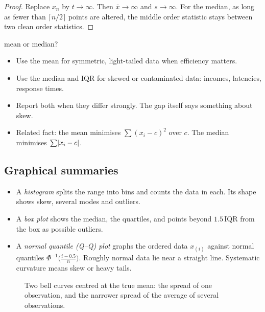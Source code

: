\begin{proof}
Replace $x_n$ by $t\to\infty$. Then $\bar{x}\to\infty$ and $s\to\infty$. For the median, as long as fewer than $\lceil n/2\rceil$ points are altered, the middle order statistic stays between two clean order statistics.
\end{proof}

\begin{interview}{mean or median?}
\begin{itemize}
  \item Use the mean for symmetric, light-tailed data when efficiency matters.
  \item Use the median and IQR for skewed or contaminated data: incomes, latencies, response times.
  \item Report both when they differ strongly. The gap itself says something about skew.
  \item Related fact: the mean minimises $\sum(x_i-c)^2$ over $c$. The median minimises $\sum\lvert x_i-c\rvert$.
\end{itemize}
\end{interview}

\subsection*{Graphical summaries}

\begin{itemize}
  \item A \emph{histogram} splits the range into bins and counts the data in each. Its shape shows skew, several modes and outliers.
  \item A \emph{box plot} shows the median, the quartiles, and points beyond $1.5\,\mathrm{IQR}$ from the box as possible outliers.
  \item A \emph{normal quantile (Q--Q) plot} graphs the ordered data $x_{(i)}$ against normal quantiles $\Phi^{-1}\big(\tfrac{i-0.5}{n}\big)$. Roughly normal data lie near a straight line. Systematic curvature means skew or heavy tails.
\end{itemize}

\begin{figure}[h]
\centering
{}
\caption{Two bell curves centred at the true mean: the spread of one observation, and the narrower spread of the average of several observations.}
\end{figure}

